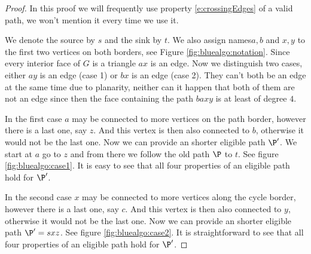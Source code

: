 \begin{proof}
In this proof we will frequently use property \ref{e:crossingEdges} of a valid path, we won't mention it every time we use it.

We denote the source by $s$ and the sink by $t$. We also assign names$a, b$ and $x, y$ to the first two vertices on both borders, see Figure \ref{fig:bluealgo:notation}. Since every interior face of $G$ is a triangle $ax$ is an edge. Now we distinguish two cases, either $ay$ is an edge (case 1) or $bx$ is an edge (case 2). They can't both be an edge at the same time due to planarity, neither can it happen that both of them are not an edge since then the face containing the path $baxy$ is at least of degree $4$.

In the first case $a$ may be connected to more vertices on the path border, however there is a last one, say $z$. And this vertex is then also connected to $b$, otherwise it would not be the last one. Now we can provide an shorter eligible path $\P'$. We start at $a$ go to $z$ and from there we follow the old path $\P$ to $t$.  See figure \ref{fig:bluealgo:case1}. It is easy to see that all four properties of an eligible path hold for $\P'$.

In the second case $x$ may be connected to more vertices along the cycle border, however there is a last one, say $c$. And this vertex is then also connected to $y$, otherwise it would not be the last one. Now we can provide an shorter eligible path $\P' = sxz$.   See figure \ref{fig:bluealgo:case2}. It is straightforward to see that all four properties of an eligible path hold for $\P'$. %
\end{proof}

